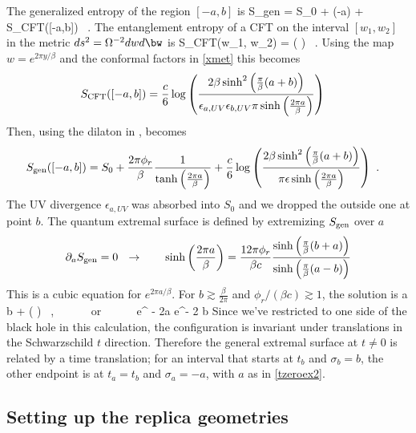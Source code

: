  
The generalized entropy of the region $[-a,b]$ is
\be {}
S_{\rm gen} = S_0 + \phi(-a) +  
S_{\rm CFT}([-a,b]) \ .
\ee
The entanglement entropy of a CFT on the interval $[w_1,w_2]$ in the metric $ds^2=\Omega^{-2} dw d\bw$ is
\be\label{scftgeneral}
S_{\rm CFT}(w_1, w_2) = \log \left( \right) \ .
\ee
Using the map $w = e^{2 \pi y/\beta}$ and the conformal factors in \eqref{xmet} this becomes
\begin{align}
S_{\rm CFT}([-a,b]) &= 
 \frac{c}{6}\log \left(  \frac{2\beta\sinh^2 \left( \frac{\pi}{\beta} (a+b)\right) }{\epsilon_{a,UV} \epsilon_{b,UV} \pi    \sinh \left( \frac{2\pi a}{\beta} \right)}\right)
\end{align}
Then, using the dilaton in ,  becomes 
\begin{align}\label{sgens}
S_{\rm gen}([-a,b]) &=
S_0 + \frac{2\pi \phi_r}{\beta}\frac{1}{\tanh \left( \frac{2\pi a}{\beta} \right)  } 
+   \frac{c}{6}\log \left( \frac{2\beta\sinh^2\left( \frac{\pi}{\beta}(a+b) \right) }{ \pi \epsilon \sinh \left( \frac{2 \pi a}{\beta}\right)} \right) \ .
\end{align}
The UV divergence $\epsilon_{a,UV}$ was absorbed into $S_0$ and we dropped the outside one at point $b$. 
The quantum extremal surface is defined by extremizing $S_{\rm gen}$ over $a$ 
\begin{align} \label{tzeroex2}
\partial_a S_{\rm gen} =0 ~~\to~~~~~~ \sinh \left(\frac{2\pi a}{\beta} \right) =  \frac{12 \pi \phi_r}{\beta c} \frac{\sinh \left( \frac{\pi}{\beta}(b+a)\right)}{\sinh \left( \frac{\pi}{\beta}(a-b)\right)}
\end{align}
This is a cubic equation for $e^{2\pi a/\beta}$. For $b \gtrsim \frac{\beta}{2\pi}$  and $\phi_r/(\beta c) \gtrsim 1$,  the solution is
\be {}
a \approx b  + \frac{\beta}{2\pi}\log \left( \right) ~, ~~~~~~{\rm or } ~~~~~ e^{ - { 2\pi a \over \beta} } { e^{-{ 2 \pi b \over \beta } } 
} 
\ee
Since we've restricted to one side of the black hole in this calculation, the configuration is invariant under translations in the Schwarzschild $t$ direction. Therefore the general extremal surface at $t\neq 0$ is related by a time translation; for an interval that starts at $t_b$ and $\sigma_b = b$, the other endpoint is at 
  $t_a = t_b$ and $\sigma_a=-a$, with $a$ as in   \eqref{tzeroex2}.


\subsection{Setting up the  replica geometries }

